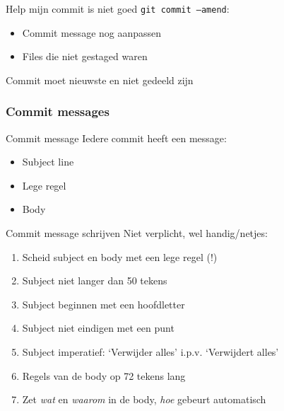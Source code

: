\begin{frame}{Help mijn commit is niet goed}
	\texttt{git commit --amend}:
	\begin{itemize}
		\item Commit message nog aanpassen
		\item Files die niet gestaged waren
	\end{itemize}
	\alert{Commit moet nieuwste en niet gedeeld zijn}
\end{frame}

\subsubsection{Commit messages}
\begin{frame}{Commit message}
	Iedere commit heeft een message:
	\begin{itemize}
		\item Subject line
		\item Lege regel
		\item Body
	\end{itemize}
\end{frame}

\begin{frame}{Commit message schrijven}
	Niet verplicht, wel handig/netjes:
	\begin{enumerate}
		\item Scheid subject en body met een lege regel (!)
		\item Subject niet langer dan 50 tekens
		\item Subject beginnen met een hoofdletter
		\item Subject niet eindigen met een punt
		\item Subject imperatief: `Verwijder alles' i.p.v. `Verwijdert alles'
		\item Regels van de body op 72 tekens lang
		\item Zet \emph{wat} en \emph{waarom} in de body, \emph{hoe} gebeurt automatisch
	\end{enumerate}
\end{frame}

